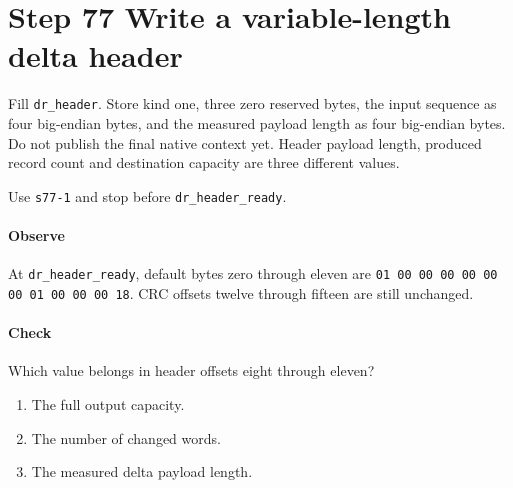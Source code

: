 \section{Step 77 Write a variable-length delta header}
Fill \texttt{dr\_header}. Store kind one, three zero reserved bytes, the input sequence as four big-endian bytes, and the measured payload length as four big-endian bytes. Do not publish the final native context yet. Header payload length, produced record count and destination capacity are three different values.

Use \texttt{s77-1} and stop before \texttt{dr\_header\_ready}.

\paragraph{Observe} At \texttt{dr\_header\_ready}, default bytes zero through eleven are \texttt{01 00 00 00 00 00 00 01 00 00 00 18}. CRC offsets twelve through fifteen are still unchanged.

\paragraph{Check} Which value belongs in header offsets eight through eleven?
\begin{enumerate}[label=\Alph*.]
  \item The full output capacity.
  \item The number of changed words.
  \item The measured delta payload length.
\end{enumerate}
